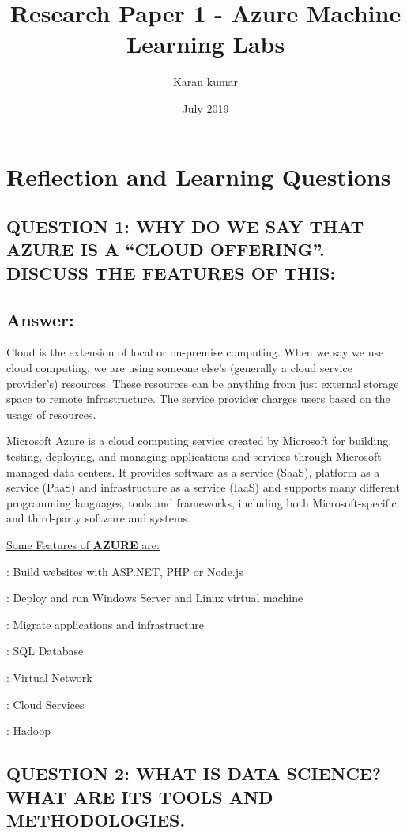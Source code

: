 \documentclass[10 pm]{article}
\title  {Research Paper 1 - Azure Machine Learning Labs }
\author{Karan kumar}
\date{July 2019}
\begin{document}
\maketitle


\section{Reflection and Learning Questions}

\subsection{QUESTION 1: WHY DO WE SAY THAT AZURE IS A “CLOUD OFFERING”. DISCUSS THE FEATURES OF THIS:}

\subsection*{Answer:}
Cloud is the extension of local or on-premise computing. When we say we use cloud computing, we are using someone else’s (generally a cloud service provider’s) resources. These resources can be anything from just external storage space to remote infrastructure. The service provider charges users based on the usage of resources. 

Microsoft Azure is a cloud computing service created by Microsoft for building, testing, deploying, and managing applications and services through Microsoft-managed data centers. It provides software as a service (SaaS), platform as a service (PaaS) and infrastructure as a service (IaaS) and supports many different programming languages, tools and frameworks, including both Microsoft-specific and third-party software and systems. 

\underline{Some Features of \textbf{AZURE} are:} 

 : Build websites with ASP.NET, PHP or Node.js

 : Deploy and run Windows Server and Linux virtual machine

 : Migrate applications and infrastructure

 : SQL Database	

 : Virtual Network

 : Cloud Services

 : Hadoop


\subsection{QUESTION 2: WHAT IS DATA SCIENCE? WHAT ARE ITS TOOLS AND METHODOLOGIES.}
\end{document}
